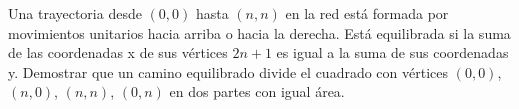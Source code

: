 Una trayectoria desde $ (0,0)$ hasta $ (n,n)$ en la red está formada por movimientos unitarios hacia arriba o hacia la derecha. Está equilibrada si la suma de las coordenadas x de sus vértices $ 2n+{}1$ es igual a la suma de sus coordenadas y. Demostrar que un camino equilibrado divide el cuadrado con vértices $ (0,0)$, $ (n,0)$, $ (n,n)$, $ (0,n)$ en dos partes con igual área.
